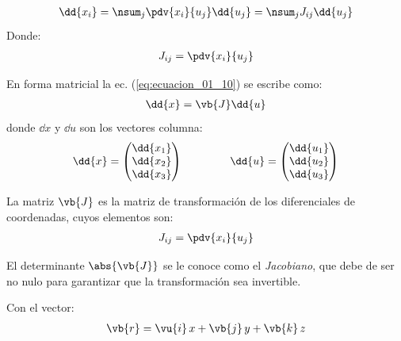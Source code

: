 \begin{align}
\dd{x_{i}} = \nsum_{j} \pdv{x_{i}}{u_{j}} \dd{u_{j}} = \nsum_{j} J_{ij} \dd{u_{j}}
\label{eq:ecuacion_01_10}
\end{align}
Donde:
\begin{align}
J_{ij} = \pdv{x_{i}}{u_{j}}
\label{eq:ecuacion_01_11}
\end{align}

En forma matricial la ec. (\ref{eq:ecuacion_01_10}) se escribe como:
\begin{align}
\dd{x} = \vb{J} \dd{u}
\end{align}
donde $\dd{x}$ y $\dd{u}$ son los vectores columna:
\begin{align*}
\dd{x} = \begin{pmatrix}
\dd{x_{1}} \\
\dd{x_{2}} \\
\dd{x_{3}} \\
\end{pmatrix}
\hspace{1.5cm}
\dd{u} = \begin{pmatrix}
\dd{u_{1}} \\
\dd{u_{2}} \\
\dd{u_{3}} \\
\end{pmatrix}
\end{align*}

La matriz $\vb{J}$ es la matriz de transformación de los diferenciales de coordenadas, cuyos elementos son:
\begin{align*}
J_{ij} = \pdv{x_{i}}{u_{j}}
\end{align*}

El determinante $\abs{\vb{J}}$ se le conoce como el \emph{Jacobiano}, que debe de ser no nulo para garantizar que la transformación sea invertible.

Con el vector:
\begin{align*}
\vb{r} = \vu{i} \, x + \vb{j} \, y + \vb{k} \,z
\end{align*}

